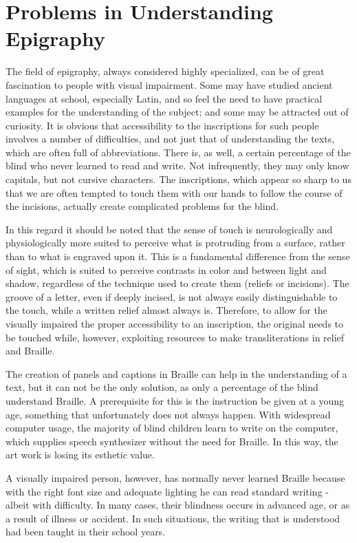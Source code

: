 \documentclass[amsthm,ebook]{saparticle}
\begin{document}
\section{Problems in Understanding Epigraphy}
\noindent The field of epigraphy, always considered highly specialized, can be of great fascination to people with visual
impairment. Some may have studied ancient languages at school, especially Latin, and so feel the need to have practical
examples for the understanding of the subject; and some may be attracted out of curiosity. It is obvious that
accessibility to the inscriptions for such people involves a number of difficulties, and not just that of understanding
the texts, which are often full of abbreviations. There is, as well, a certain percentage of the blind who never
learned to read and write. Not infrequently, they may only know capitals, but not cursive characters. The inscriptions,
which appear so sharp to us that we are often tempted to touch them with our hands to follow the course of the
incisions, actually create complicated problems for the blind.

In this regard it should be noted that the sense of touch is neurologically and physiologically more suited to perceive
what is protruding from a surface, rather than to what is engraved upon it. This is a fundamental difference from the
sense of sight, which is suited to perceive contrasts in color and between light and shadow, regardless of the
technique used to create them (reliefs or incisions). The groove of a letter, even if deeply incised, is not always
easily distinguishable to the touch, while a written relief almost always is. Therefore, to allow for the visually
impaired the proper accessibility to an inscription, the original needs to be touched while, however, exploiting
resources to make transliterations in relief and Braille.

The creation of panels and captions in Braille can help in the understanding of a text, but it can not be the only
solution, as only a percentage of the blind understand Braille. A prerequisite for this is the instruction be given at
a young age, something that unfortunately does not always happen. With widespread computer usage, the majority of blind
children learn to write on the computer, which supplies speech synthesizer without the need for Braille. In this way,
the art work is losing its esthetic value.

A visually impaired person, however, has normally never learned Braille because with the right font size and adequate
lighting he can read standard writing - albeit with difficulty. In many cases, their blindness occurs in advanced age,
or as a result of illness or accident. In such situations, the writing that is understood had been taught in their
school years.
\end{document}
